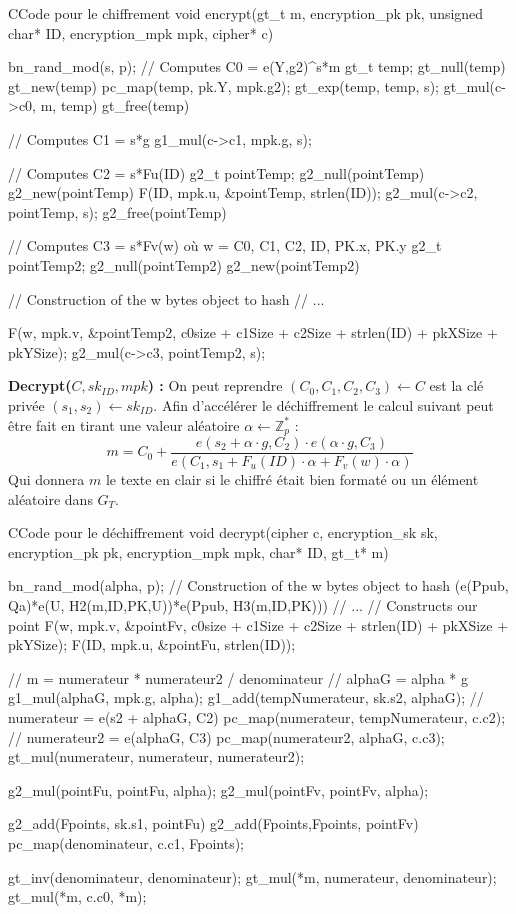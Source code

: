 \begin{sourcebox}{C}{Code pour le chiffrement}
	void encrypt(gt_t m, encryption_pk pk, unsigned char* ID, encryption_mpk mpk, cipher* c){
		bn_rand_mod(s, p);
		// Computes C0 = e(Y,g2)^s*m
		gt_t temp;
		gt_null(temp)
		gt_new(temp)
		pc_map(temp, pk.Y, mpk.g2);
		gt_exp(temp, temp, s);
		gt_mul(c->c0, m, temp)
		gt_free(temp)
		
		// Computes C1 = s*g
		g1_mul(c->c1, mpk.g, s);
		
		// Computes C2 = s*Fu(ID)
		g2_t pointTemp;
		g2_null(pointTemp)
		g2_new(pointTemp)
		F(ID, mpk.u, &pointTemp, strlen(ID));
		g2_mul(c->c2, pointTemp, s);
		g2_free(pointTemp)
		
		// Computes C3 = s*Fv(w) où w = C0, C1, C2, ID, PK.x, PK.y
		g2_t pointTemp2;
		g2_null(pointTemp2)
		g2_new(pointTemp2)
		
		// Construction of the w bytes object to hash
		// ...
		
		F(w, mpk.v, &pointTemp2, c0size + c1Size + c2Size + strlen(ID) + pkXSize + pkYSize);
		g2_mul(c->c3, pointTemp2, s);
	}
\end{sourcebox}

\textbf{Decrypt($C, sk_{ID}, mpk$) :} On peut reprendre $(C_0,C_1,C_2,C_3) \leftarrow C$ est la clé privée $(s_1, s_2) \leftarrow sk_{ID}$. Afin d'accélérer le déchiffrement le calcul suivant peut être fait en tirant une valeur aléatoire $\alpha \leftarrow \mathbb{Z}_p^*$ :
\[m = C_0 + \frac{e(s_2 + \alpha \cdot g, C_2 ) \cdot e(\alpha \cdot g, C_3)}{e(C_1, s_1 + F_u(ID) \cdot \alpha + F_v(w) \cdot \alpha)}\]
Qui donnera $m$ le texte en clair si le chiffré était bien formaté ou un élément aléatoire dans $G_T$.

\begin{sourcebox}{C}{Code pour le déchiffrement}
	void decrypt(cipher c, encryption_sk sk, encryption_pk pk, encryption_mpk  mpk, char* ID, gt_t* m){
		bn_rand_mod(alpha, p);
		// Construction of the w bytes object to hash (e(Ppub, Qa)*e(U, H2(m,ID,PK,U))*e(Ppub, H3(m,ID,PK)))
		// ...
		// Constructs our point
		F(w, mpk.v, &pointFv, c0size + c1Size + c2Size + strlen(ID) + pkXSize + pkYSize);
		F(ID, mpk.u, &pointFu, strlen(ID));
		
		// m = numerateur * numerateur2 / denominateur
		// alphaG = alpha * g
		g1_mul(alphaG, mpk.g, alpha);
		g1_add(tempNumerateur, sk.s2, alphaG);
		// numerateur = e(s2 + alphaG, C2)
		pc_map(numerateur, tempNumerateur, c.c2);
		// numerateur2 = e(alphaG, C3)
		pc_map(numerateur2, alphaG, c.c3);
		gt_mul(numerateur, numerateur, numerateur2);
		
		g2_mul(pointFu, pointFu, alpha);
		g2_mul(pointFv, pointFv, alpha);
		
		g2_add(Fpoints, sk.s1, pointFu)
		g2_add(Fpoints,Fpoints, pointFv)
		pc_map(denominateur, c.c1, Fpoints);
		
		gt_inv(denominateur, denominateur);
		gt_mul(*m, numerateur, denominateur);
		gt_mul(*m, c.c0, *m);
	}
\end{sourcebox}

